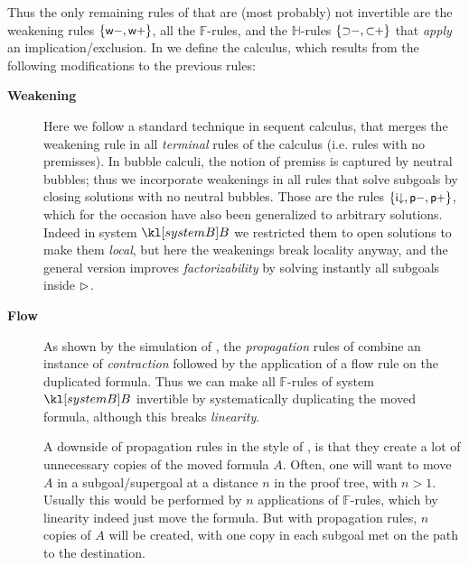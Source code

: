Thus the only remaining rules of  that are (most probably) not
invertible are the weakening rules $\{\text{\small$\mathsf{w{-}}$},\text{\small$\mathsf{w{+}}$}\}$, all the
$\mathbb{F}$-rules, and the $\mathbb{H}$-rules $\{\text{\small$\mathsf{{\supset}{-}}$},
\text{\small$\mathsf{{\subset}{+}}$}\}$ that \emph{apply} an implication/exclusion.
In  we define the  calculus, which results
from the following modifications to the previous rules:
\begin{description}
  \item[\textbf{Weakening}]
    Here we follow a standard technique in sequent calculus, that merges the
    weakening rule in all \emph{terminal} rules of the calculus (i.e. rules with
    no premisses). In bubble calculi, the notion of premiss is captured by
    neutral bubbles; thus we incorporate weakenings in all rules that solve
    subgoals by closing solutions with no neutral bubbles. Those are the rules
    $\{\text{\small$\mathsf{i{\downarrow}}$},\text{\small$\mathsf{p{-}}$},\text{\small$\mathsf{p{+}}$}\}$, which for the occasion have
    also been generalized to arbitrary solutions. Indeed in system $\sysB$ we
    restricted them to open solutions to make them \emph{local}, but here the
    weakenings break locality anyway, and the general version improves
    \emph{factorizability} by solving instantly all subgoals inside $\mathbin{\rhd}$.

  \item[\textbf{Flow}]
    As shown by the simulation of , the
    \emph{propagation} rules of  combine an instance of
    \emph{contraction} followed by the application of a flow rule on the
    duplicated formula. Thus we can make all $\mathbb{F}$-rules of system
    $\sysB$ invertible by systematically duplicating the moved formula, although
    this breaks \emph{linearity}.

    A downside of propagation rules in the style of , is that they
    create a lot of unnecessary copies of the moved formula $A$. Often, one will
    want to move $A$ in a subgoal/supergoal at a distance $n$ in the proof tree,
    with $n > 1$. Usually this would be performed by $n$ applications of
    $\mathbb{F}$-rules, which by linearity indeed just move the formula. But with
    propagation rules, $n$ copies of $A$ will be created, with one copy in each
    subgoal met on the path to the destination.


\end{description}

